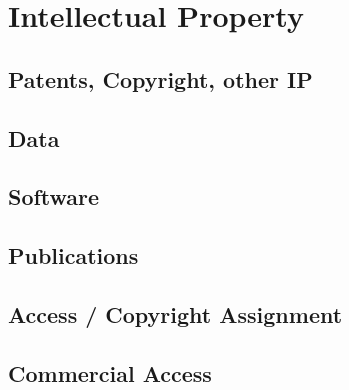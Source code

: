 \chapter{Intellectual Property}

\section{Patents, Copyright, other IP}

\section{Data}
%

\section{Software}
%

\section{Publications}
%

\section{Access / Copyright Assignment}
%

\section{Commercial Access}



